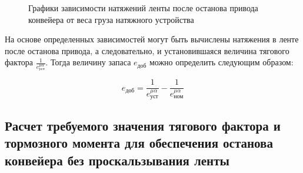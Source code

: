 \begin{figure}[h!]
  \begin{minipage}[h]{0.49\linewidth}
  \end{minipage}
  \hfill
  \begin{minipage}[h]{0.49\linewidth}
  \end{minipage}
  \caption{Графики зависимости натяжений ленты после останова привода конвейера от веса груза натяжного устройства}
  \label{img:4.s1s4}  
\end{figure}

На основе определенных зависимостей могут быть вычислены натяжения в ленте после останова привода, а следовательно, и установившаяся величина тягового фактора  $ \frac{1}{e^{\mu\alpha}_\text{уст}} $. Тогда величину запаса $ e_\text{доб} $ можно определить следующим образом:

\begin{equation}
\label{eq:4.edob}
e_\text{доб} = \frac{1}{e^{\mu\alpha}_{\text{уст}}} - \frac{1}{e^{\mu\alpha}_{\text{ном}}}
\end{equation}

\subsection{Расчет требуемого значения тягового фактора и тормозного момента для обеспечения останова конвейера без проскальзывания ленты} \label{sect54_2_2}
\fi
